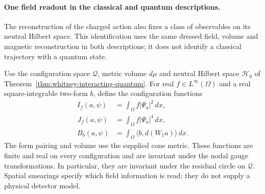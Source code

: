 \paragraph{One field readout in the classical and quantum descriptions.}
The reconstruction of the charged action also fixes a class of observables
on its neutral Hilbert space. This identification uses the same dressed
field, volume and magnetic reconstruction in both descriptions; it does
not identify a classical trajectory with a quantum state.

Use the configuration space \(\mathcal Q\), metric volume \(d\mu\)
and neutral Hilbert space \(\mathcal H_0\) of
Theorem~\ref{thm:whitney-interacting-quantum}. For real
\(f\in L^\infty(\Omega)\) and a real square-integrable two-form
\(b\), define the configuration functions
\begin{equation}
 \begin{aligned}
 I_f(a,\psi)&=\int_\Omega f|\Psi_a|^2\,dx,\\
 J_f(a,\psi)&=\int_\Omega f|\Psi_a|^4\,dx,\\
 B_b(a,\psi)&=\int_\Omega\langle b,d(W_1a)\rangle\,dx.
 \end{aligned}
 \label{eq:whitney-common-observables}
\end{equation}
The form pairing and volume use the supplied cone metric. These functions
are finite and real on every configuration and are invariant under the
nodal gauge transformations. In particular, they are invariant under the
residual circle on \(\mathcal Q\). Spatial smearings specify which
field information is read; they do not supply a physical detector model.

